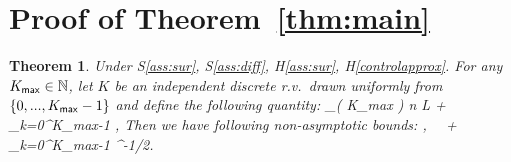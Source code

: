 \documentclass[11pt]{article}
\newtheorem*{Theorem*}{Theorem}
\theoremstyle{t}
\begin{document}
\section{Proof of Theorem~\ref{thm:main}}
\begin{Theorem*}
Under S\ref{ass:sur}, S\ref{ass:diff}, H\ref{ass:sur}, H\ref{controlapprox}. For any $K_{\sf max} \in \NN$, let $K$ be an independent discrete r.v.~drawn uniformly from $\{0,...,K_{\sf max}-1\}$ and define the following quantity:
\beq \notag
\Delta_{( K_{\sf max} )}  n L  +  \sum_{k=0}^{K_{\sf max}-1}  \eqsp,
\eeq
Then we have following non-asymptotic bounds:
\beq \notag
\EE {} \leq {},~~
\EE[ g_-( \hp{K} ) ] \leq {} +  \sum_{k=0}^{K_{\sf max}-1} ^{-1/2}.
\eeq
\end{Theorem*}
\end{document}
